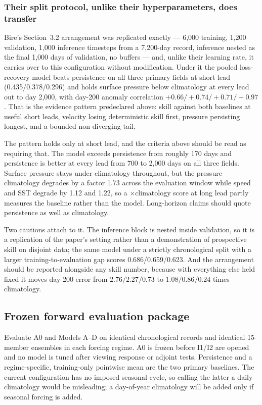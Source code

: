 \documentclass[11pt]{article}
\begin{document}
\subsubsection*{Their split protocol, unlike their hyperparameters, does transfer}

Bire's Section~3.2 arrangement was replicated exactly --- 6,000 training, 1,200
validation, 1,000 inference timesteps from a 7,200-day record, inference nested as the
final 1,000 days of validation, no buffers --- and, unlike their learning rate, it
carries over to this configuration without modification.  Under it the pooled
loss-recovery model beats persistence on all three primary fields at short lead
(0.435/0.378/0.296) and holds surface pressure below climatology at every lead out to
day 2,000, with day-200 anomaly correlation \(+0.66/+0.74/+0.71/+0.97\).  That is the
evidence pattern predeclared above: skill against both baselines at useful short leads,
velocity losing deterministic skill first, pressure persisting longest, and a bounded
non-diverging tail.

The pattern holds only at short lead, and the criteria above should be read as
requiring that.  The model exceeds persistence from roughly 170 days and persistence is
better at every lead from 700 to 2,000 days on all three fields.  Surface pressure stays
under climatology throughout, but the pressure climatology degrades by a factor 1.73
across the evaluation window while speed and SST degrade by 1.12 and 1.22, so a
\(\times\)climatology score at long lead partly measures the baseline rather than the
model.  Long-horizon claims should quote persistence as well as climatology.

Two cautions attach to it.  The inference block is nested inside validation, so it is a
replication of the paper's setting rather than a demonstration of prospective skill on
disjoint data; the same model under a strictly chronological split with a larger
training-to-evaluation gap scores 0.686/0.659/0.623.  And the arrangement should be
reported alongside any skill number, because with everything else held fixed it moves
day-200 error from \(2.76/2.27/0.73\) to \(1.08/0.86/0.24\) times climatology.

\subsection{Frozen forward evaluation package}

Evaluate A0 and Models A--D on identical chronological records and identical 15-member
ensembles in each forcing regime.  A0 is frozen before I1/I2 are opened and no model is
tuned after viewing response or adjoint tests.  Persistence and a regime-specific,
training-only pointwise mean are the two primary baselines.  The current configuration
has no imposed seasonal cycle, so calling the latter a daily climatology would be
misleading; a day-of-year climatology will be added only if seasonal forcing is added.
\end{document}
